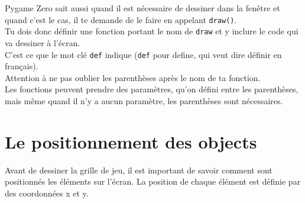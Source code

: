 \documentclass[11pt]{article}
\newcommand{\trad}[1]{\marginnote{\textcolor{deepblue}{#1}}}
\begin{document}
Pygame Zero sait aussi quand il est nécessaire de dessiner dans la fenêtre et quand c'est le cas, il te demande de le faire en appelant \lstinline{draw()}.\\
Tu dois donc définir une fonction portant le nom de \lstinline{draw} et y inclure le code qui va dessiner à l'écran.\\
C'est ce que le mot clé \lstinline{def} indique (\lstinline{def} pour define, qui veut dire définir en français).\\
Attention à ne pas oublier les parenthèses après le nom de ta fonction.\\
Les fonctions peuvent prendre des paramètres, qu'on défini entre les parenthèses, mais même quand il n'y a aucun paramètre, les parenthèses sont nécessaires.
\\

\pagebreak

\section{Le positionnement des objects}

Avant de dessiner la grille de jeu, il est important de savoir comment
sont positionnés les éléments sur l'écran.
La position de chaque élément est définie par des coordonnées x et y.

\begin{center}
\end{center}
\end{document}
